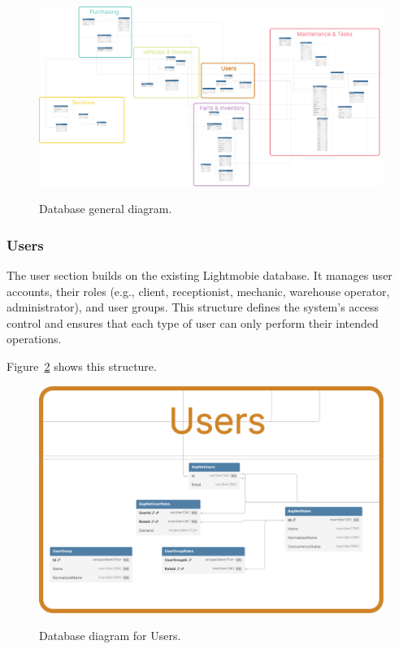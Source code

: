 \begin{figure}[h]
  \caption{Database general diagram.}
  \centering
  \includegraphics[width=\textwidth]{figs/dbDiagrams/DbDiagramFull}
  \label{fig:dbGeneral} 
\end{figure}



\subsubsection{Users} 

The user section builds on the existing Lightmobie database. It manages user accounts, their roles (e.g., client, receptionist, mechanic, warehouse operator, administrator), and user groups. This structure defines the system’s access control and ensures that each type of user can only perform their intended operations.

Figure~\ref{fig:dbUsers} shows this structure.

\begin{figure}[h]
  \caption{Database diagram for Users.}
  \centering
  \includegraphics[width=\textwidth]{figs/dbDiagrams/Users}
  \label{fig:dbUsers}
\end{figure}


